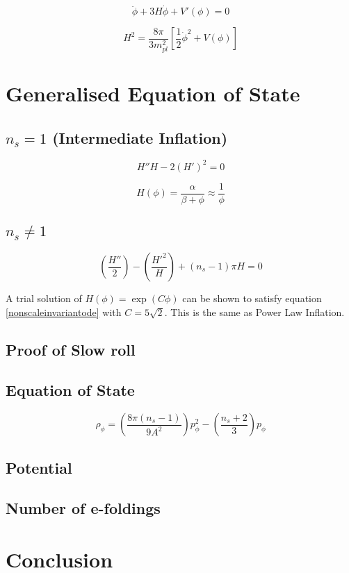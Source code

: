 \documentclass[12pt]{article} %
\begin{document}
\begin{equation}
\ddot{\phi} + 3H\dot{\phi}+V'(\phi)=0
\end{equation}

\begin{equation}
H^{2}=\frac{8\pi}{3 m_{pl}^{2}}[\frac{1}{2}\dot{\phi}^{2}+V(\phi)]
\end{equation}

\section{Generalised Equation of State}

\subsection{$n_{s}=1$ (Intermediate Inflation)}

\begin{equation}
H''H - 2(H')^{2}=0
\end{equation}

\begin{equation}
H(\phi) = \frac{\alpha}{\beta + \phi} \approx \frac{1}{\phi}
\end{equation}

\subsection{$n_{s} \neq 1$}

\begin{equation}\label{nonscaleinvariantode}
\left( \frac{H''}{2}\right) - \left( \frac{H'^{2}}{H}\right) + \left( n_{s} - 1\right)\pi H = 0
\end{equation}

A trial solution of $H(\phi) = \exp(C\phi)$ can be shown to satisfy equation \ref{nonscaleinvariantode} with $C=5\sqrt{2}$. This is the same as Power Law Inflation.

\subsection{Proof of Slow roll}

\subsection{Equation of State}

\begin{equation}
\rho_{\phi} = \left( \frac{8\pi \left(n_{s}-1\right)}{9 A^{2}}\right)p_{\phi}^{2} - \left(\frac{n_{s}+2}{3}\right)p_{\phi}
\end{equation}

\subsection{Potential}

\subsection{Number of e-foldings}

\section{Conclusion}

{}

\end{document}
